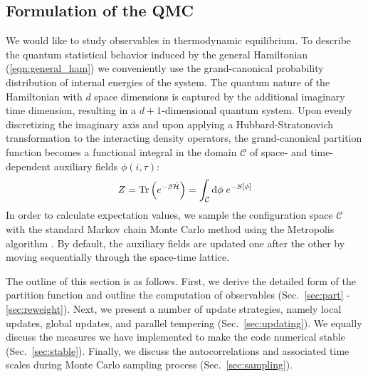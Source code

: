 


\subsection{Formulation of the QMC}  
We would like to study observables in  thermodynamic equilibrium. 
To describe the quantum statistical behavior induced by the general Hamiltonian (\ref{eqn:general_ham})
we conveniently use the  grand-canonical probability distribution of internal energies of the system. 
The quantum nature of the Hamiltonian with $d$ space dimensions is captured by the additional imaginary time dimension, 
resulting in a $d+1$-dimensional quantum system. 
Upon evenly discretizing the imaginary axis and upon applying a Hubbard-Stratonovich  transformation \cite{Hubbard59} to the interacting density operators, 
the grand-canonical partition function becomes a functional integral in the domain $\mathcal{C}$ of space- and time-dependent auxiliary fields $\phi(i,\tau)$:
\begin{equation}
Z = \mathop{\mathrm{Tr}}{\left(e^{-\beta \hat{\mathcal{H}} }\right)}
= \int_{\mathcal{C}}\mathrm{d}\phi \;e^{-S[\phi]}
\end{equation}
In order to calculate expectation values, we sample the configuration space $\mathcal{C}$  with the standard Markov chain Monte Carlo method using the Metropolis algorithm \cite{Metropolis, Kennedy, Binder}. 
By default, the auxiliary fields are updated one after the other by moving sequentially through the space-time lattice.

The outline of this section is as follows. First, we derive the detailed form of the partition function and outline the computation of observables (Sec.~\ref{sec:part} -\ref{sec:reweight}). 
Next, we present a number of update strategies, namely local updates, global updates, and parallel tempering (Sec.~\ref{sec:updating}). 
We equally discuss the measures we have implemented to make the code numerical stable (Sec.~\ref{sec:stable}). Finally, we discuss the autocorrelations and associated time scales during 
Monte Carlo sampling process (Sec.~\ref{sec:sampling}). 


